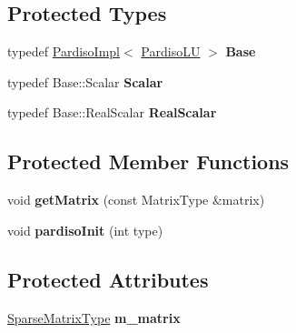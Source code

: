 \subsection*{Protected Types}
\begin{DoxyCompactItemize}
\item 
\mbox{\label{class_eigen_1_1_pardiso_l_u_a828d8c2d392e2304d18aedef4cb647e8}} 
typedef \mbox{\hyperlink{class_eigen_1_1_pardiso_impl}{Pardiso\+Impl}}$<$ \mbox{\hyperlink{class_eigen_1_1_pardiso_l_u}{Pardiso\+LU}} $>$ {\bfseries Base}
\item 
\mbox{\label{class_eigen_1_1_pardiso_l_u_a980c6f143fbc5dada4b61766c5a40910}} 
typedef Base\+::\+Scalar {\bfseries Scalar}
\item 
\mbox{\label{class_eigen_1_1_pardiso_l_u_a646566f09e32d2f2034950261ee748b0}} 
typedef Base\+::\+Real\+Scalar {\bfseries Real\+Scalar}
\end{DoxyCompactItemize}
\subsection*{Protected Member Functions}
\begin{DoxyCompactItemize}
\item 
\mbox{\label{class_eigen_1_1_pardiso_l_u_ae9c24d54ea4eb0bfa43091cae3196735}} 
void {\bfseries get\+Matrix} (const Matrix\+Type \&matrix)
\item 
\mbox{\label{class_eigen_1_1_pardiso_l_u_a4d13fa79acda71b1164e07d61156462f}} 
void {\bfseries pardiso\+Init} (int type)
\end{DoxyCompactItemize}
\subsection*{Protected Attributes}
\begin{DoxyCompactItemize}
\item 
\mbox{\label{class_eigen_1_1_pardiso_l_u_a48bb9ea75a9d6f123211a3606282424a}} 
\mbox{\hyperlink{class_eigen_1_1_sparse_matrix}{Sparse\+Matrix\+Type}} {\bfseries m\+\_\+matrix}
\end{DoxyCompactItemize}

